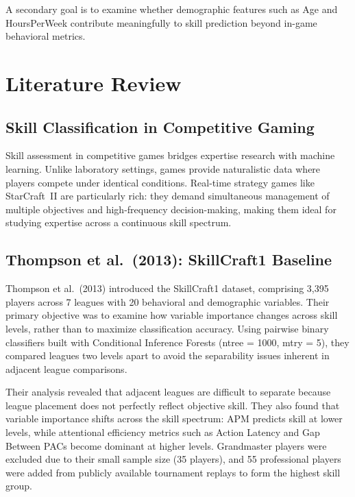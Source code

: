 \documentclass[12pt, a4paper]{article}
\begin{document}
A secondary goal is to examine whether demographic features such as Age and HoursPerWeek
contribute meaningfully to skill prediction beyond in-game behavioral metrics.


\section{Literature Review}

\subsection{Skill Classification in Competitive Gaming}

Skill assessment in competitive games bridges expertise research with machine learning.
Unlike laboratory settings, games provide naturalistic data where players compete under
identical conditions. Real-time strategy games like StarCraft~II are particularly rich:
they demand simultaneous management of multiple objectives and high-frequency
decision-making, making them ideal for studying expertise across a continuous skill
spectrum.

\subsection{Thompson et al.\ (2013): SkillCraft1 Baseline}

Thompson et al.\ (2013) introduced the SkillCraft1 dataset, comprising 3,395 players
across 7 leagues with 20 behavioral and demographic variables. Their primary objective
was to examine how variable importance changes across skill levels, rather than to
maximize classification accuracy. Using pairwise binary classifiers built with
Conditional Inference Forests (ntree = 1000, mtry = 5), they compared leagues two
levels apart to avoid the separability issues inherent in adjacent league comparisons.

Their analysis revealed that adjacent leagues are difficult to separate because league
placement does not perfectly reflect objective skill. They also found that variable
importance shifts across the skill spectrum: APM predicts skill at lower levels, while
attentional efficiency metrics such as Action Latency and Gap Between PACs become
dominant at higher levels. Grandmaster players were excluded due to their small sample
size (35 players), and 55 professional players were added from publicly available
tournament replays to form the highest skill group.
\end{document}
